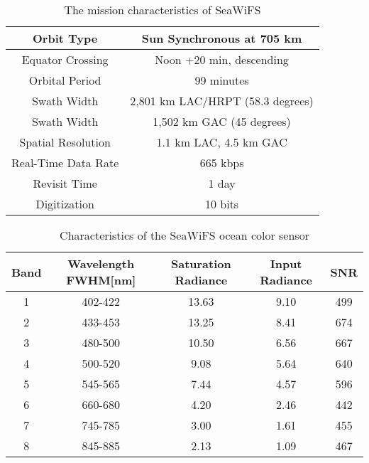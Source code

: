  \begin{table}[b!]
 	\caption{The mission characteristics of SeaWiFS}
 	\label{table01}
 	\centering
 	\begin{tabular}{c  c}
  	\toprule%
  	 	Orbit Type	& Sun Synchronous at 705 km \\ \hline
 	Equator Crossing &	Noon +20 min, descending \\ \hline
 	Orbital Period &	99 minutes  \\ \hline
 	Swath Width &	2,801 km LAC/HRPT (58.3 degrees)  \\ \hline
 	Swath Width &	1,502 km GAC (45 degrees)  \\ \hline
 	Spatial Resolution &	1.1 km LAC, 4.5 km GAC  \\ \hline
 	Real-Time Data Rate &	665 kbps  \\ \hline
 	Revisit Time &	1 day  \\ \hline
 	Digitization &	10 bits  \\ 
 	\bottomrule
 	\end{tabular}
 \end{table}

 \begin{table}[b!]%
	\caption{Characteristics of the SeaWiFS ocean color sensor}
	\label{table02}
	\centering
	\begin{tabular}{c  c  c  c  c}
		\toprule
		Band	& Wavelength FWHM[nm] & Saturation Radiance & Input Radiance & SNR\\ %
		\midrule
		1 & 402-422 & 13.63 & 9.10 & 499 \\ %
		2 & 433-453 & 13.25 & 8.41 & 674  \\ %
		3 & 480-500 & 10.50 & 6.56 & 667 \\ %
		4 & 500-520 & 9.08 & 5.64 & 640  \\ %
		5 & 545-565 & 7.44 & 4.57 & 596 \\ %
		6 & 660-680 & 4.20 & 2.46 & 442  \\ %
		7 & 745-785 & 3.00 & 1.61 & 455 \\ %
		8 & 845-885 & 2.13 & 1.09 & 467  \\ %
		 	\bottomrule
	\end{tabular}
\end{table}
 
 

